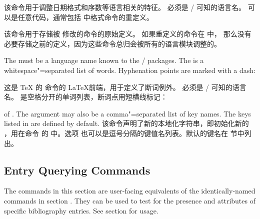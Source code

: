 \begin{ltxsyntax}
该命令用于调整日期格式和序数等语言相关的特征。
 必须是 / 可知的语言名。
 可以是任意代码，通常包括  中格式命令的重定义。



该命令用于存储被  修改的命令的原始定义。
如果重定义的命令在  中，
那么没有必要存储之前的定义，因为这些命令总归会被所有的语言模块调整的。


The  must be a language name known to the / packages. The  is a whitespace"=separated list of words. Hyphenation points are marked with a dash:

这是 \TeX{} 的  命令的 \LaTeX 前端，用于定义了断词例外。
 必须是 / 可知的语言名。
 是空格分开的单词列表，断词点用短横线标记：

\begin{ltxexample}
\end{ltxexample}


 of . The  argument may also be a comma"=separated list of key names. The keys listed in  are defined by default.
该命令声明了新的本地化字符串，即初始化新的 ，用在命令  的  中。选项  也可以是逗号分隔的键值名列表。默认的键名在  节中列出。
\end{ltxsyntax}

\subsection{Entry Querying Commands}
\label{use:eq}
The commands in this section are user-facing equivalents of the identically-named commands in section . They can be used to test for the presence and attributes of specific bibliography entries. See section  for usage.

